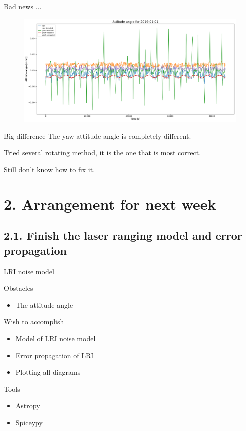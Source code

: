 \documentclass[12pt,english,ignorenonframetext,]{beamer}
\begin{document}
\begin{frame}{Bad news $\dots$}
	\begin{figure}
		\includegraphics[height=0.5\textheight]{..//images//attitude_angle_2019_01_01.png}
	\end{figure}
	\begin{block}{Big difference}
		The yaw attitude angle is completely different.
		
		Tried several rotating method, it is the one that is most correct.
		
		Still don't know how to fix it.
	\end{block}
\end{frame}


\section{\hfill{}2. Arrangement for next week\hfill{}}
\subsection{\hfill{}2.1. Finish the laser ranging model and error propagation\hfill{}}
\begin{frame}{LRI noise model}
	\begin{block}{Obstacles}
		\begin{itemize}
			\item The attitude angle
		\end{itemize}
	\end{block}
	\begin{block}{Wish to accomplish}
		\begin{itemize}
			\item Model of LRI noise model
			\item Error propagation of LRI
			\item Plotting all diagrams
		\end{itemize}
	\end{block}
	\begin{block}{Tools}
		\begin{itemize}
			\item Astropy
			\item Spiceypy
		\end{itemize}
	\end{block}
\end{frame}
\end{document}
